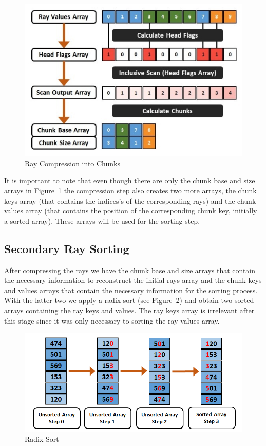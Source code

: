 \begin{figure}[!htb]
    \centering
    \includegraphics[scale=0.75]{Images/Ray_Compression}
    \caption{\label{fig:rcc}Ray Compression into Chunks}
\end{figure}

It is important to note that even though there are only the chunk base and size arrays in Figure~\ref{fig:rcc} the compression step also creates two more arrays, the chunk keys array (that contains the indices's of the corresponding rays) and the chunk values array (that contains the position of the corresponding chunk key, initially a sorted array). These arrays will be used for the sorting step.

\subsection{Secondary Ray Sorting}

After compressing the rays we have the chunk base and size arrays that contain the necessary information to reconstruct the initial rays array and the chunk keys and values arrays that contain the necessary information for the sorting process. With the latter two we apply a radix sort \cite{Merrill11} (see Figure~\ref{fig:rs}) and obtain two sorted arrays containing the ray keys and values. The ray keys array is irrelevant after this stage since it was only necessary to sorting the ray values array.

\begin{figure}[!htb]
    \centering
    \includegraphics[scale=0.75]{Images/Radix_Sort}
    \caption{\label{fig:rs}Radix Sort}
\end{figure}

